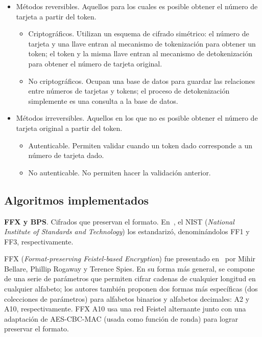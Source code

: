 \begin{itemize}
  \item Métodos reversibles. Aquellos para los cuales es posible obtener el
    número de tarjeta a partir del token.
    \begin{itemize}
      \item Criptográficos. Utilizan un esquema de cifrado simétrico: el número
        de tarjeta y una llave entran al mecanismo de tokenización para obtener
        un token; el token y la misma llave entran al mecanismo de
        detokenización para obtener el número de tarjeta original.
      \item No criptográficos. Ocupan una base de datos para guardar las
        relaciones entre números de tarjetas y tokens; el proceso de
        detokenización simplemente es una consulta a la base de datos.
    \end{itemize}
  \item Métodos irreversibles. Aquellos en los que no es posible obtener el
    número de tarjeta original a partir del token.
    \begin{itemize}
      \item Autenticable. Permiten validar cuando un token dado corresponde a
        un número de tarjeta dado.
      \item No autenticable. No permiten hacer la validación anterior.
    \end{itemize}
\end{itemize}

\subsection{Algoritmos implementados}
\label{sec:implementaciones}

\textbf{FFX y BPS}. Cifrados que preservan el formato. En~\cite{nist_fpe}, el
NIST (\textit{National Institute of Standards and Technology}) los estandarizó,
denominándolos FF1 y FF3, respectivamente.


FFX (\textit{Format-preserving Feistel-based Encryption}) fue presentado
en~\cite{ffx_1} por Mihir Bellare, Phillip Rogaway y Terence Spies. En su forma
más general, se compone de una serie de parámetros que permiten cifrar cadenas
de cualquier longitud en cualquier alfabeto; los autores también proponen dos
formas más específicas (dos colecciones de parámetros) para alfabetos binarios y
alfabetos decimales: A2 y A10, respectivamente. FFX A10 usa una red Feistel
alternante junto con una adaptación de AES-CBC-MAC (usada como función de ronda)
para lograr preservar el formato.


